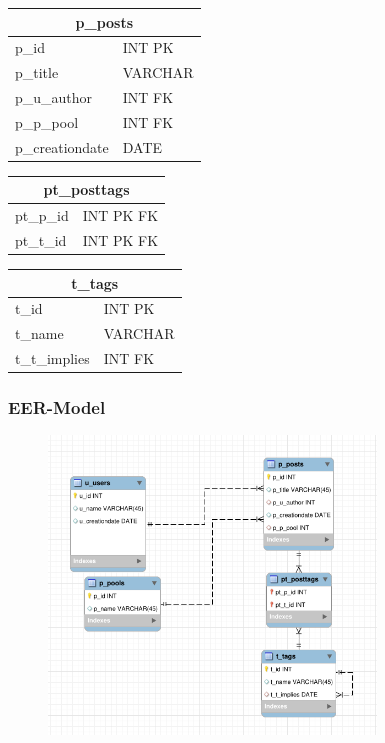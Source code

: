 \documentclass[a4paper,12pt]{article}
\begin{document}
\begin{table}[h]
	\begin{tabular}{ll}
		\multicolumn{2}{c}{p\_posts}                   \\ \hline
		\multicolumn{1}{l|}{p\_id}           & INT PK  \\
		\multicolumn{1}{l|}{p\_title}        & VARCHAR \\
		\multicolumn{1}{l|}{p\_u\_author}    & INT FK  \\
		\multicolumn{1}{l|}{p\_p\_pool}      & INT FK  \\
		\multicolumn{1}{l|}{p\_creationdate} & DATE   
	\end{tabular}
\end{table}

\begin{table}[!h]
	\begin{tabular}{ll}
		\multicolumn{2}{c}{pt\_posttags}           \\ \hline
		\multicolumn{1}{l|}{pt\_p\_id} & INT PK FK \\
		\multicolumn{1}{l|}{pt\_t\_id} & INT PK FK
	\end{tabular}
\end{table}

\begin{table}[!h]
	\begin{tabular}{ll}
		\multicolumn{2}{c}{t\_tags}                  \\ \hline
		\multicolumn{1}{l|}{t\_id}         & INT PK  \\
		\multicolumn{1}{l|}{t\_name}       & VARCHAR \\
		\multicolumn{1}{l|}{t\_t\_implies} & INT FK 
	\end{tabular}
\end{table}

\newpage
\subsubsection{EER-Model}
\begin{figure}[!ht]
	\includegraphics[height=300px]{../imgs/EER-Modell-V1.png}
\end{figure}
\end{document}
